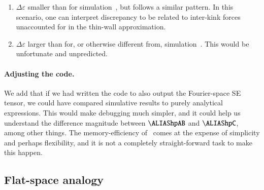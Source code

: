 \begin{itemize}
\begin{enumerate}
        \item $\Delta \varepsilon$ smaller than for simulation~, but follows a similar pattern. In this scenario, one can interpret discrepancy to be related to inter-kink forces unaccounted for in the thin-wall approximation.
        \item $\Delta \varepsilon$ larger than for, or otherwise different from, simulation~. This would be unfortunate and unpredicted.
    \end{enumerate}
\end{itemize}


\paragraph{Adjusting the code.} We add that if we had written the code to also output the Fourier-space SE tensor, we could have compared simulative results to purely analytical expressions. This would make debugging much simpler, and it could help us understand the difference magnitude between $\hpAB$ and $\hpC$, among other things. The memory-efficiency of~\gevolution{} comes at the expense of simplicity and perhaps flexibility, and it is not a completely straight-forward task to make this happen.



\subsection{Flat-space analogy}\label{sec:whatif:cont:minkowski}
